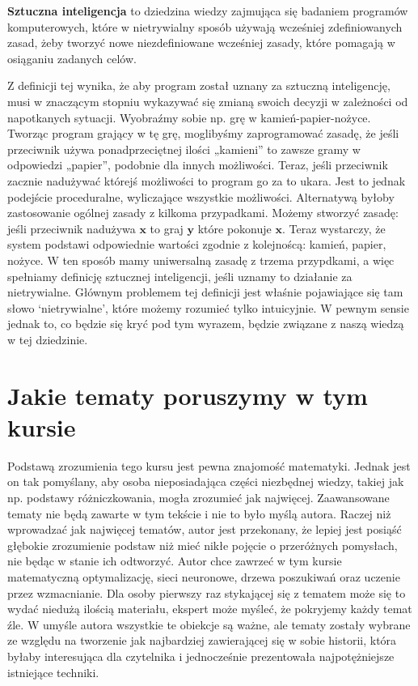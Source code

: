 \noindent \textbf{Sztuczna inteligencja} to dziedzina wiedzy zajmująca się badaniem programów komputerowych, które w nietrywialny sposób używają wcześniej zdefiniowanych zasad, żeby tworzyć nowe niezdefiniowane wcześniej zasady, które pomagają w osiąganiu zadanych celów.\newline

Z definicji tej wynika, że aby program został uznany za sztuczną inteligencję, musi w znaczącym stopniu wykazywać się zmianą swoich decyzji w zależności od napotkanych sytuacji. Wyobraźmy sobie np. grę w kamień-papier-nożyce. Tworząc program grający w tę grę, moglibyśmy zaprogramować zasadę, że jeśli przeciwnik używa ponadprzeciętnej ilości „kamieni” to zawsze gramy w odpowiedzi „papier”, podobnie dla innych możliwości. Teraz, jeśli przeciwnik zacznie nadużywać którejś możliwości to program go za to ukara. Jest to jednak podejście proceduralne, wyliczające wszystkie możliwości. Alternatywą byłoby zastosowanie ogólnej zasady z kilkoma przypadkami. Możemy stworzyć zasadę: jeśli przeciwnik nadużywa $\boldsymbol{x}$ to graj $\boldsymbol{y}$ które pokonuje $\boldsymbol{x}$. Teraz wystarczy, że system podstawi odpowiednie wartości zgodnie z kolejnoścą: kamień, papier, nożyce. W ten sposób mamy uniwersalną zasadę z trzema przypdkami, a więc spełniamy definicję sztucznej inteligencji, jeśli uznamy to działanie za nietrywialne. Głównym problemem tej definicji jest właśnie pojawiające się tam słowo ‘nietrywialne’, które możemy rozumieć tylko intuicyjnie. W pewnym sensie jednak to, co będzie się kryć pod tym wyrazem, będzie związane z naszą wiedzą w tej dziedzinie.

\section{Jakie tematy poruszymy w tym kursie}

Podstawą zrozumienia tego kursu jest pewna znajomość matematyki. Jednak jest on tak pomyślany, aby osoba nieposiadająca części niezbędnej wiedzy, takiej jak np. podstawy różniczkowania, mogła zrozumieć jak najwięcej. Zaawansowane tematy nie będą zawarte w tym tekście i nie to było myślą autora. Raczej niż wprowadzać jak najwięcej tematów, autor jest przekonany, że lepiej jest posiąść głębokie zrozumienie podstaw niż mieć nikłe pojęcie o przeróżnych pomysłach, nie będąc w stanie ich odtworzyć. Autor chce zawrzeć w tym kursie matematyczną optymalizację, sieci neuronowe, drzewa poszukiwań oraz uczenie przez wzmacnianie. Dla osoby pierwszy raz stykającej się z tematem może się to wydać niedużą ilością materiału, ekspert może myśleć, że pokryjemy każdy temat źle. W umyśle autora wszystkie te obiekcje są ważne, ale tematy zostały wybrane ze względu na tworzenie jak najbardziej zawierającej się w sobie historii, która byłaby interesująca dla czytelnika i jednocześnie prezentowała najpotężniejsze istniejące techniki.
